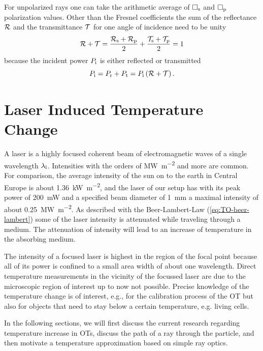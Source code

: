 For unpolarized rays one can take the arithmetic average of $\Box_{\mathrm{s}}$ and 
$\Box_{\mathrm{p}}$ polarization values. Other than the Fresnel coefficients the 
sum of the reflectance $\mathcal{R}$ and the transmittance $\mathcal{T}$ for one 
angle of incidence need to be unity
\begin{equation}
  \mathcal{R} + \mathcal{T} = 
  \frac{\mathcal{R}_{\mathrm{s}}+\mathcal{R}_{\mathrm{p}}}{2} +
  \frac{\mathcal{T}_{\mathrm{s}}+\mathcal{T}_{\mathrm{p}}}{2} = 1 
  \label{eq:TO-fresnel}
\end{equation}
because the incident power $P_{\mathrm{i}}$ is either reflected or transmitted
\begin{equation}
  P_{\mathrm{i}} = P_{\mathrm{r}} + P_{\mathrm{t}} = P_{\mathrm{i}}\left( \mathcal{R} + \mathcal{T} 
  \right).
\end{equation}

\section{Laser Induced Temperature Change\label{sec:TO-temperature}}

A laser is a highly focused coherent beam of electromagnetic waves of a single 
wavelength $\lambda_{\mathrm{l}}$. Intensities with the orders of 
\si{\mega\watt\per\square\meter} and more are common. For comparison, the 
average intensity of the sun on to the earth in Central Europe is about 
\SI{1.36}{\kilo\watt\per\square\meter}, and the laser of our setup has with its 
peak power of \SI{200}{\milli\watt} and a specified beam diameter of 
\SI{1}{\mm} a maximal intensity of about 
\SI{0.25}{\mega\watt\per\square\meter}. As described with the Beer-Lambert-Law
(\cref{eq:TO-beer-lambert}) some of the laser intensity is attenuated while 
traveling through a medium. The attenuation of intensity will lead to an 
increase of temperature in the absorbing medium.

The intensity of a focused laser is highest in the region of the focal point 
because all of its power is confined to a small area width of about one 
wavelength. Direct temperature measurements in the vicinity of the focussed 
laser are due to the microscopic region of interest up to now not possible.  
Precise knowledge of the temperature change is of interest, e.g., for the 
calibration process of the OT but also for objects that need to stay below a 
certain temperature, e.g. living cells.

In the following sections, we will first discuss the current research regarding 
temperature increase in OTs, discuss the path of a ray through the particle, 
and then motivate a temperature approximation based on simple ray optics.

